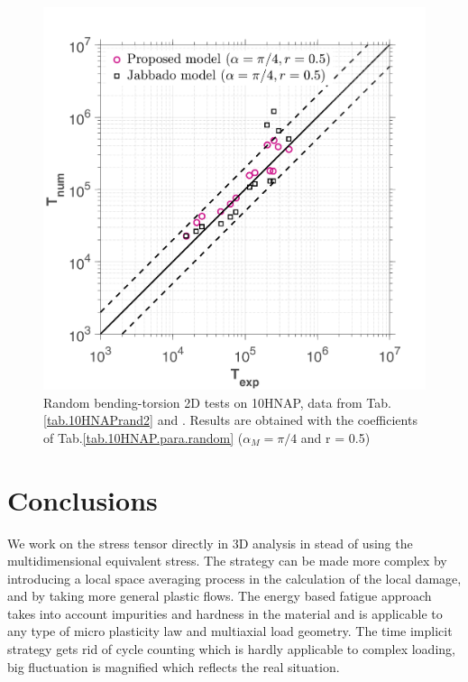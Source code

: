 \begin{figure}[!h]
	\centering
	\includegraphics[width=\textwidth]{figures//HNAP_random_r05_error.png} 
	\caption{Random bending-torsion 2D tests on 10HNAP, data from Tab.\ref{tab.10HNAPrand2} and \cite{jabbado:pastel-00002116}. Results are obtained with the coefficients of Tab.\ref{tab.10HNAP.para.random} ($\alpha_{M} = \pi/4$ and r = 0.5)}
	\label{fig.10HNAP_random05}
\end{figure}


\clearpage
\section{Conclusions}

We work on the stress tensor directly in 3D analysis in stead of using the multidimensional equivalent stress.
The strategy can be made more complex by introducing a local space averaging process in the calculation of the local damage, and by taking more general plastic flows. The energy based fatigue approach takes into account impurities and hardness in the material and is applicable to any type of micro plasticity law and multiaxial load geometry. The time implicit strategy gets rid of cycle counting which is hardly applicable to complex loading, big fluctuation is magnified which reflects the real situation.

